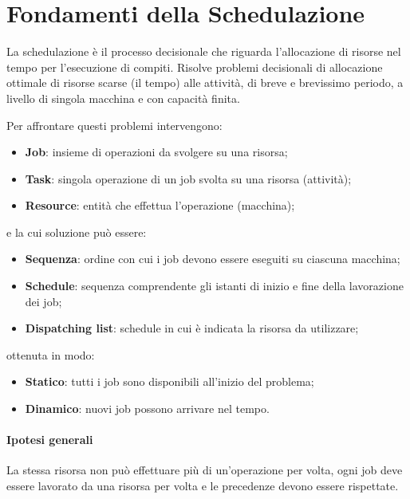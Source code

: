 %
%
\section{Fondamenti della Schedulazione}
La schedulazione è il processo decisionale che riguarda l'allocazione di risorse nel tempo per l'esecuzione di compiti.
Risolve problemi decisionali di allocazione ottimale di risorse scarse (il tempo) alle attività, di breve e brevissimo periodo, a livello di singola macchina e con capacità finita.

Per affrontare questi problemi intervengono:
\begin{itemize}
    \item \textbf{Job}: insieme di operazioni da svolgere su una risorsa;
    \item \textbf{Task}: singola operazione di un job svolta su una risorsa (attività);
    \item \textbf{Resource}: entità che effettua l'operazione (macchina);
\end{itemize}
e la cui soluzione può essere:
\begin{itemize}
    \item \textbf{Sequenza}: ordine con cui i job devono essere eseguiti su ciascuna macchina;
    \item \textbf{Schedule}: sequenza comprendente gli istanti di inizio e fine della lavorazione dei job;
    \item \textbf{Dispatching list}: schedule in cui è indicata la risorsa da utilizzare;
\end{itemize}
ottenuta in modo:
\begin{itemize}
    \item \textbf{Statico}: tutti i job sono disponibili all'inizio del problema;
    \item \textbf{Dinamico}: nuovi job possono arrivare nel tempo.
\end{itemize}

%
\paragraph{Ipotesi generali} La stessa risorsa non può effettuare più di un'operazione per volta, ogni job deve essere lavorato da una risorsa per volta e le precedenze devono essere rispettate.

%
